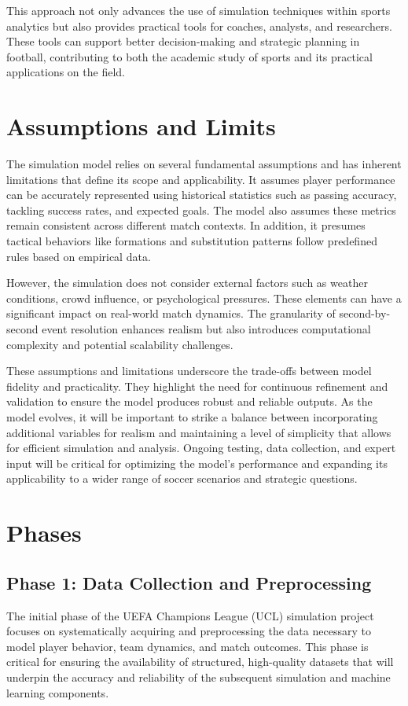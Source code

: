 \documentclass[12pt]{article}
\begin{document}
This approach not only advances the use of simulation techniques within sports analytics but also provides practical tools for coaches, analysts, and researchers. These tools can support better decision-making and strategic planning in football, contributing to both the academic study of sports and its practical applications on the field.

\section{Assumptions and Limits}
The simulation model relies on several fundamental assumptions and has inherent limitations that define its scope and applicability. It assumes player performance can be accurately represented using historical statistics such as passing accuracy, tackling success rates, and expected goals. The model also assumes these metrics remain consistent across different match contexts. In addition, it presumes tactical behaviors like formations and substitution patterns follow predefined rules based on empirical data.

However, the simulation does not consider external factors such as weather conditions, crowd influence, or psychological pressures. These elements can have a significant impact on real-world match dynamics. The granularity of second-by-second event resolution enhances realism but also introduces computational complexity and potential scalability challenges.

These assumptions and limitations underscore the trade-offs between model fidelity and practicality. They highlight the need for continuous refinement and validation to ensure the model produces robust and reliable outputs. As the model evolves, it will be important to strike a balance between incorporating additional variables for realism and maintaining a level of simplicity that allows for efficient simulation and analysis. Ongoing testing, data collection, and expert input will be critical for optimizing the model's performance and expanding its applicability to a wider range of soccer scenarios and strategic questions.

\section{Phases}
\subsection{Phase 1: Data Collection and Preprocessing}
The initial phase of the UEFA Champions League (UCL) simulation project focuses on systematically acquiring and preprocessing the data necessary to model player behavior, team dynamics, and match outcomes. This phase is critical for ensuring the availability of structured, high-quality datasets that will underpin the accuracy and reliability of the subsequent simulation and machine learning components.
\end{document}
